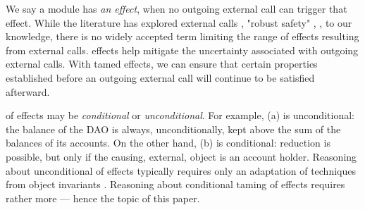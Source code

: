  We say a module has \emph{\tamed an effect}, when no outgoing external call can trigger that effect.
  While the literature has explored external calls \cite{vanproving,cerise-jacm2024,vmsl-pldi2023,ddd}, "robust safety" \cite{gordonJefferyRobustSafety,robustSafetyPatrignani,abate2019journey}, \etc, to our knowledge, there is no widely accepted term limiting the range of effects resulting from external calls.
%
\Tamed effects help mitigate the uncertainty associated with outgoing external calls. 
With tamed effects, we can ensure that certain properties established before an outgoing external call will continue to be satisfied afterward.



 
 \Taming of effects may be   \emph{conditional} or \emph{unconditional}.
For example, (a) is unconditional: the balance of the DAO is always, unconditionally, kept above the sum of the balances of its accounts.
On the other hand, (b) is conditional: %
 reduction is possible, but only  if the causing, external, 
 object is an account holder. 
Reasoning about {unconditional}  \taming of  effects     typically requires only an adaptation of
  techniques from %
object  invariants \cite{staticsfull,DrossoFrancaMuellerSummers08,BarDelFahLeiSch04,objInvars,MuellerPoetzsch-HeffterLeavens06}.
  Reasoning about  {conditional} taming of    effects
requires rather more --- {hence} the topic of this paper. 


